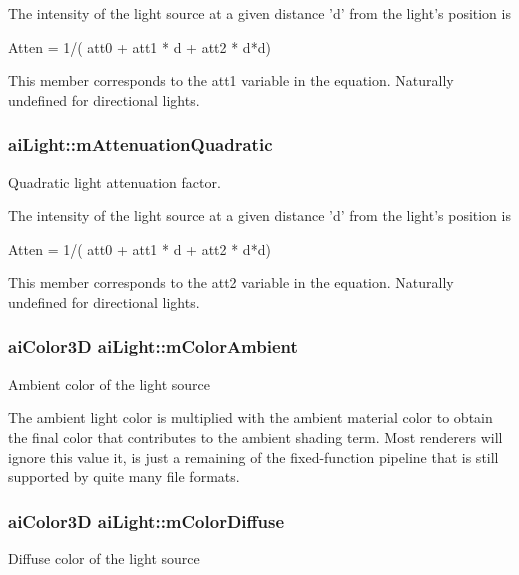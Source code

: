The intensity of the light source at a given distance 'd' from the light's position is 
\begin{DoxyCode}
Atten = 1/( att0 + att1 * d + att2 * d*d)
\end{DoxyCode}
 This member corresponds to the att1 variable in the equation. Naturally undefined for directional lights. \hypertarget{structai_light_ab4fb07bfa40a807661b1ed1791838a6d}{
\subsubsection[{m\-Attenuation\-Quadratic}]{ ai\-Light\-::m\-Attenuation\-Quadratic}}\label{structai_light_ab4fb07bfa40a807661b1ed1791838a6d}
Quadratic light attenuation factor.

The intensity of the light source at a given distance 'd' from the light's position is 
\begin{DoxyCode}
Atten = 1/( att0 + att1 * d + att2 * d*d)
\end{DoxyCode}
 This member corresponds to the att2 variable in the equation. Naturally undefined for directional lights. \hypertarget{structai_light_a5188b60e6fbaf1635fa780913508e3cd}{
\subsubsection[{m\-Color\-Ambient}]{ {\bf ai\-Color3\-D} ai\-Light\-::m\-Color\-Ambient}}\label{structai_light_a5188b60e6fbaf1635fa780913508e3cd}
Ambient color of the light source

The ambient light color is multiplied with the ambient material color to obtain the final color that contributes to the ambient shading term. Most renderers will ignore this value it, is just a remaining of the fixed-\/function pipeline that is still supported by quite many file formats. \hypertarget{structai_light_a22e7feebbfaf53adf73bd9f581636efd}{
\subsubsection[{m\-Color\-Diffuse}]{ {\bf ai\-Color3\-D} ai\-Light\-::m\-Color\-Diffuse}}\label{structai_light_a22e7feebbfaf53adf73bd9f581636efd}
Diffuse color of the light source

